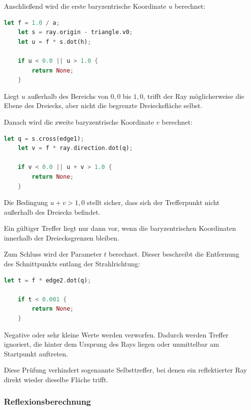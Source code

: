 \documentclass{article}
\begin{document}
    Anschließend wird die erste baryzentrische Koordinate \(u\) berechnet:

    \begin{lstlisting}[language=Rust]
    let f = 1.0 / a;
    let s = ray.origin - triangle.v0;
    let u = f * s.dot(h);

    if u < 0.0 || u > 1.0 {
        return None;
    }
    \end{lstlisting}

    Liegt \(u\) außerhalb des Bereichs von \(0{,}0\) bis \(1{,}0\), trifft der
    Ray möglicherweise die Ebene des Dreiecks, aber nicht die begrenzte
    Dreiecksfläche selbst.

    Danach wird die zweite baryzentrische Koordinate \(v\) berechnet:

    \begin{lstlisting}[language=Rust]
    let q = s.cross(edge1);
    let v = f * ray.direction.dot(q);

    if v < 0.0 || u + v > 1.0 {
        return None;
    }
    \end{lstlisting}

    Die Bedingung \(u + v > 1{,}0\) stellt sicher, dass sich der Trefferpunkt
    nicht außerhalb des Dreiecks befindet.

    Ein gültiger Treffer liegt nur dann vor, wenn die baryzentrischen Koordinaten
    innerhalb der Dreiecksgrenzen bleiben.

    Zum Schluss wird der Parameter \(t\) berechnet. Dieser beschreibt die
    Entfernung des Schnittpunkts entlang der Strahlrichtung:

    \begin{lstlisting}[language=Rust]
    let t = f * edge2.dot(q);

    if t < 0.001 {
        return None;
    }
    \end{lstlisting}

    Negative oder sehr kleine Werte werden verworfen. Dadurch werden Treffer
    ignoriert, die hinter dem Ursprung des Rays liegen oder unmittelbar am
    Startpunkt auftreten.

    Diese Prüfung verhindert sogenannte Selbsttreffer, bei denen ein
    reflektierter Ray direkt wieder dieselbe Fläche trifft.


    \subsubsection{Reflexionsberechnung}
    \label{subsubsec:3d-reflection}
\end{document}
